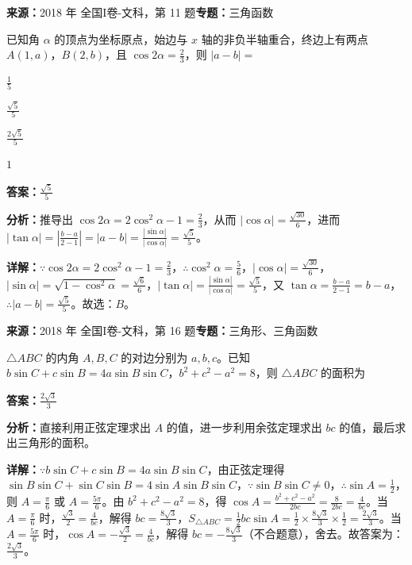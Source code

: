 \begin{question}[points=5]
\textbf{来源：}2018 年 全国I卷-文科，第 11 题\quad \textbf{专题：}三角函数\par
已知角 $\alpha$ 的顶点为坐标原点，始边与 $x$ 轴的非负半轴重合，终边上有两点 $A(1,a)$，$B(2,b)$，且 $\cos2\alpha=\frac{2}{3}$，则 $|a-b|=$
\begin{choices}
  \item $\frac{1}{5}$
  \item $\frac{\sqrt{5}}{5}$
  \item $\frac{2\sqrt{5}}{5}$
  \item $1$
\end{choices}
\begin{solution}
\textbf{答案：}$\frac{\sqrt{5}}{5}$

\textbf{分析：}推导出 $\cos2\alpha=2\cos^2\alpha-1=\frac{2}{3}$，从而 $|\cos\alpha|=\frac{\sqrt{30}}{6}$，进而 $|\tan\alpha|=|\frac{b-a}{2-1}|=|a-b|=\frac{|\sin\alpha|}{|\cos\alpha|}=\frac{\sqrt{5}}{5}$。

\textbf{详解：}$\because \cos2\alpha=2\cos^2\alpha-1=\frac{2}{3}$，$\therefore \cos^2\alpha=\frac{5}{6}$，$|\cos\alpha|=\frac{\sqrt{30}}{6}$，$|\sin\alpha|=\sqrt{1-\cos^2\alpha}=\frac{\sqrt{6}}{6}$，$|\tan\alpha|=\frac{|\sin\alpha|}{|\cos\alpha|}=\frac{\sqrt{5}}{5}$，又 $\tan\alpha=\frac{b-a}{2-1}=b-a$，$\therefore |a-b|=\frac{\sqrt{5}}{5}$。故选：$B$。
\end{solution}
\end{question}

\begin{question}[points=5]
\textbf{来源：}2018 年 全国I卷-文科，第 16 题\quad \textbf{专题：}三角形、三角函数\par
$\triangle ABC$ 的内角 $A,B,C$ 的对边分别为 $a,b,c$。已知 $b\sin C+c\sin B=4a\sin B\sin C$，$b^2+c^2-a^2=8$，则 $\triangle ABC$ 的面积为
\begin{solution}
\textbf{答案：}$\frac{2\sqrt{3}}{3}$

\textbf{分析：}直接利用正弦定理求出 $A$ 的值，进一步利用余弦定理求出 $bc$ 的值，最后求出三角形的面积。

\textbf{详解：}$\because b\sin C+c\sin B=4a\sin B\sin C$，由正弦定理得 $\sin B\sin C+\sin C\sin B=4\sin A\sin B\sin C$，$\because \sin B\sin C\neq0$，$\therefore \sin A=\frac{1}{2}$，则 $A=\frac{\pi}{6}$ 或 $A=\frac{5\pi}{6}$。由 $b^2+c^2-a^2=8$，得 $\cos A=\frac{b^2+c^2-a^2}{2bc}=\frac{8}{2bc}=\frac{4}{bc}$。当 $A=\frac{\pi}{6}$ 时，$\frac{\sqrt{3}}{2}=\frac{4}{bc}$，解得 $bc=\frac{8\sqrt{3}}{3}$，$S_{\triangle ABC}=\frac{1}{2}bc\sin A=\frac{1}{2}\times\frac{8\sqrt{3}}{3}\times\frac{1}{2}=\frac{2\sqrt{3}}{3}$。当 $A=\frac{5\pi}{6}$ 时，$\cos A=-\frac{\sqrt{3}}{2}=\frac{4}{bc}$，解得 $bc=-\frac{8\sqrt{3}}{3}$（不合题意），舍去。故答案为：$\frac{2\sqrt{3}}{3}$。
\end{solution}
\end{question}

